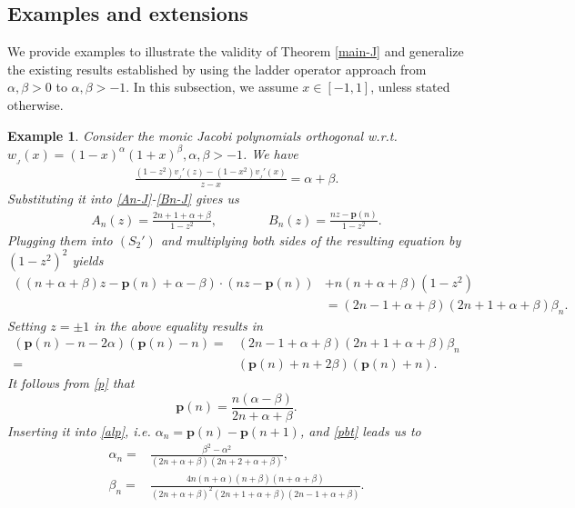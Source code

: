 \documentclass[12pt,a4paper]{article}    %
\newtheorem{exm}{Example}
\numberwithin{equation}{section}
\begin{document}
\subsection{Examples and extensions}
We provide examples to illustrate the validity of Theorem \ref{main-J} and generalize the existing results established by using the ladder operator approach from $\alpha,\beta>0$ to $\alpha,\beta>-1$. In this subsection, we assume $x\in[-1,1]$, unless stated otherwise.

\begin{exm}\label{classicJ}
 Consider the monic Jacobi polynomials orthogonal w.r.t. $w_{_J}(x)=(1-x)^{\alpha}(1+x)^{\beta},\alpha,\beta>-1$. We have
\begin{align*}
\frac{(1-z^2)v_{_J}'(z)-(1-x^2)v_{_J}'(x)}{z-x}=\alpha+\beta.
    \end{align*}
Substituting it into \eqref{An-J}-\eqref{Bn-J} gives us
\begin{align*}
A_n(z)=\frac{2n+1+\alpha+\beta}{1-z^2},\qquad\qquad
	    B_n(z)=\frac{nz-\mathbf{p}(n)}{1-z^2}.
\end{align*}
Plugging them into $(S_2')$ and multiplying both sides of the resulting equation by $(1-z^2)^2$ yields
\begin{equation*}
\begin{aligned} \left((n+\alpha+\beta)z-\mathbf{p}(n)+\alpha-\beta\right)\cdot
\left(nz-\mathbf{p}(n)\right)&+n\left(n+\alpha+\beta\right)\left(1-z^2\right)\\
&=\left(2n-1+\alpha+\beta\right)\left(2n+1+\alpha+\beta\right)\beta_n.
\end{aligned}
\end{equation*}
Setting $z=\pm1$ in the above equality results in
	\begin{align}		 \left(\mathbf{p}(n)-n-2\alpha\right)\left(\mathbf{p}(n)-n\right)
=&\left(2n-1+\alpha+\beta\right)\left(2n+1+\alpha+\beta\right)\beta_n\label{pbt}\\
=&\left(\mathbf{p}(n)+n+2\beta\right)\left(\mathbf{p}(n)+n\right).\label{p}
\end{align}
It follows from \eqref{p} that
	\begin{equation*}	 \mathbf{p}(n)=\frac{n(\alpha-\beta)}{2n+\alpha+\beta}.
	\end{equation*}	
Inserting it into \eqref{alp}, i.e. $\alpha_n=\mathbf{p}(n)-\mathbf{p}(n+1)$, and \eqref{pbt} leads us to
	\begin{align}		 \alpha_n=&\frac{\beta^2-\alpha^2}{(2n+\alpha+\beta)(2n+2+\alpha+\beta)},\label{al-J}\\
\beta_n=&\frac{4n(n+\alpha)(n+\beta)(n+\alpha+\beta)}{(2n+\alpha+\beta)^2(2n+1+\alpha+\beta)(2n-1+\alpha+\beta)}.\label{bt-J}
\end{align}
\end{exm}
\end{document}
